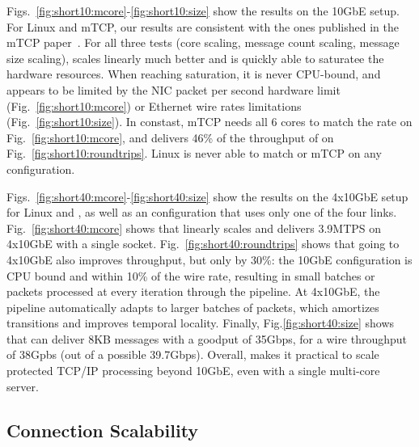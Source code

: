 
 Figs.~\ref{fig:short10:mcore}-\ref{fig:short10:size} show the results
on the 10GbE setup.  For Linux and mTCP, our results are consistent
with the ones published in the mTCP paper~\cite{jeong2014mtcp}.  For
all three tests (core scaling, message count scaling, message size
scaling), \ix scales linearly much better and is quickly able to
saturatee the hardware resources.  When reaching saturation, it is never
CPU-bound, and appears to be limited by the NIC packet per second
hardware limit (Fig.~\ref{fig:short10:mcore}) or Ethernet wire rates
limitations (Fig.~\ref{fig:short10:size}).  In constast, mTCP needs
all 6 cores to match the rate on Fig.~\ref{fig:short10:mcore}, and
delivers 46\% of the throughput of \ix on
Fig.~\ref{fig:short10:roundtrips}.  Linux is never able to match \ix
or mTCP on any configuration.





Figs.~\ref{fig:short40:mcore}-\ref{fig:short40:size} show the results
on the 4x10GbE setup for Linux and \ix, as well as an \ix
configuration that uses only one of the four
links. Fig.~\ref{fig:short40:mcore} shows that \ix linearly scales and
delivers 3.9MTPS on 4x10GbE with a single socket.
Fig.~\ref{fig:short40:roundtrips} shows that going to 4x10GbE also
improves throughput, but only by 30\%: the 10GbE configuration is CPU
bound and within 10\% of the wire rate, resulting in small batches or
 packets processed at every iteration through the \ix
pipeline.  At 4x10GbE, the pipeline automatically adapts to larger
batches of  packets, which amortizes transitions and
improves temporal locality.  Finally, Fig.\ref{fig:short40:size} shows
that \ix can deliver 8KB messages with a goodput of 35Gbps, for a wire
throughput of 38Gpbs (out of a possible 39.7Gbps).  Overall, \ix makes
it practical to scale protected TCP/IP processing beyond 10GbE, even
with a single multi-core server.


\subsection{Connection Scalability}

